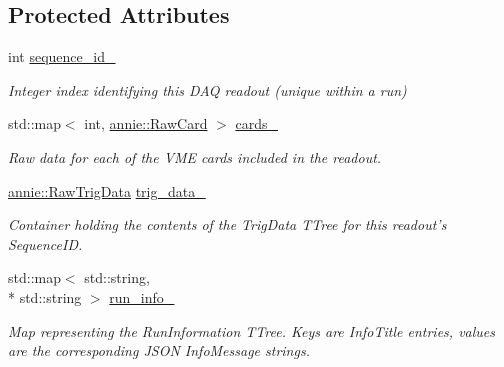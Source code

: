 \subsection*{Protected Attributes}
\begin{DoxyCompactItemize}
\item 
\hypertarget{classannie_1_1RawReadout_a68ba25af6d505d9d7e9d01af34412d56}{int \hyperlink{classannie_1_1RawReadout_a68ba25af6d505d9d7e9d01af34412d56}{sequence\-\_\-id\-\_\-}}\label{classannie_1_1RawReadout_a68ba25af6d505d9d7e9d01af34412d56}

\begin{DoxyCompactList}\small\item\em Integer index identifying this D\-A\-Q readout (unique within a run) \end{DoxyCompactList}\item 
std\-::map$<$ int, \hyperlink{classannie_1_1RawCard}{annie\-::\-Raw\-Card} $>$ \hyperlink{classannie_1_1RawReadout_a7326e38c87830bfc38205850fa557d8c}{cards\-\_\-}
\begin{DoxyCompactList}\small\item\em Raw data for each of the V\-M\-E cards included in the readout. \end{DoxyCompactList}\item 
\hypertarget{classannie_1_1RawReadout_ab1dd18ba980aa34a73ea07d936381568}{\hyperlink{classannie_1_1RawTrigData}{annie\-::\-Raw\-Trig\-Data} \hyperlink{classannie_1_1RawReadout_ab1dd18ba980aa34a73ea07d936381568}{trig\-\_\-data\-\_\-}}\label{classannie_1_1RawReadout_ab1dd18ba980aa34a73ea07d936381568}

\begin{DoxyCompactList}\small\item\em Container holding the contents of the Trig\-Data T\-Tree for this readout's Sequence\-I\-D. \end{DoxyCompactList}\item 
\hypertarget{classannie_1_1RawReadout_a0ee4f30909504cc831781b32ed3c5026}{std\-::map$<$ std\-::string, \\*
std\-::string $>$ \hyperlink{classannie_1_1RawReadout_a0ee4f30909504cc831781b32ed3c5026}{run\-\_\-info\-\_\-}}\label{classannie_1_1RawReadout_a0ee4f30909504cc831781b32ed3c5026}

\begin{DoxyCompactList}\small\item\em Map representing the Run\-Information T\-Tree. Keys are Info\-Title entries, values are the corresponding J\-S\-O\-N Info\-Message strings. \end{DoxyCompactList}\end{DoxyCompactItemize}


